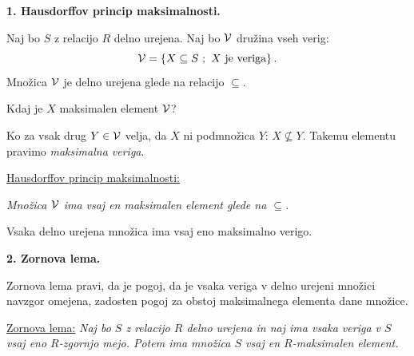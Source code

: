 \documentclass[11pt,paper=b5,DIV=13,headinclude,footinclude]{scrbook}
\begin{document}
%
%
%
%

\bigskip
\textbf{1. Hausdorffov princip maksimalnosti.}

Naj bo $S$ z relacijo $R$ delno urejena. Naj bo ${\cal V}$ družina vseh verig:
$${\cal V} = \{X\subseteq S~;~X \textrm { je veriga}\}\,.$$
Množica ${\cal V}$ je delno urejena glede na relacijo $\subseteq$.

Kdaj je $X$ maksimalen element ${\cal V}$?

Ko za vsak drug $Y\in {\cal V}$ velja, da $X$ ni podmnožica $Y$: $X\nsubseteq Y$.
Takemu elementu pravimo {\em maksimalna veriga}.

\bigskip
\underline{Hausdorffov princip maksimalnosti:}

{\em Množica ${\cal V}$ ima vsaj en maksimalen element glede na $\subseteq$.}

Vsaka delno urejena množica ima vsaj eno maksimalno verigo.

\bigskip
\textbf{2. Zornova lema.}

Zornova lema pravi, da je pogoj, da je vsaka veriga v delno urejeni množici navzgor omejena,
zadosten pogoj za obstoj maksimalnega elementa dane množice.

\medskip
\underline{Zornova lema:} {\em Naj bo $S$ z relacijo $R$ delno urejena in naj ima vsaka veriga v $S$ vsaj eno
$R$-zgornjo mejo. Potem ima množica $S$ vsaj en $R$-maksimalen element.}
\end{document}
